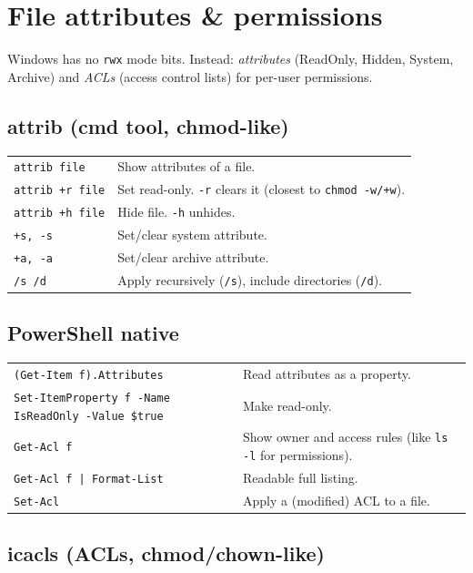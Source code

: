 \section{File attributes \& permissions}

Windows has no \texttt{rwx} mode bits. Instead: \emph{attributes} (ReadOnly, Hidden, System, Archive) and \emph{ACLs} (access control lists) for per-user permissions.\\

\subsection{attrib (cmd tool, chmod-like)}

\begin{tabularx}{\linewidth}{lX}
    \texttt{attrib file} & Show attributes of a file.\\
    \texttt{attrib +r file} & Set read-only. \texttt{-r} clears it (closest to \texttt{chmod -w/+w}).\\
    \texttt{attrib +h file} & Hide file. \texttt{-h} unhides.\\
    \texttt{+s, -s} & Set/clear system attribute.\\
    \texttt{+a, -a} & Set/clear archive attribute.\\
    \texttt{/s /d} & Apply recursively (\texttt{/s}), include directories (\texttt{/d}).\\
    \hline
\end{tabularx}

\subsection{PowerShell native}

\begin{tabularx}{\linewidth}{lX}
    \texttt{(Get-Item f).Attributes} & Read attributes as a property.\\
    \texttt{Set-ItemProperty f -Name IsReadOnly -Value \$true} & Make read-only.\\
    \texttt{Get-Acl f} & Show owner and access rules (like \texttt{ls -l} for permissions).\\
    \texttt{Get-Acl f | Format-List} & Readable full listing.\\
    \texttt{Set-Acl} & Apply a (modified) ACL to a file.\\
    \hline
\end{tabularx}

\subsection{icacls (ACLs, chmod/chown-like)}

